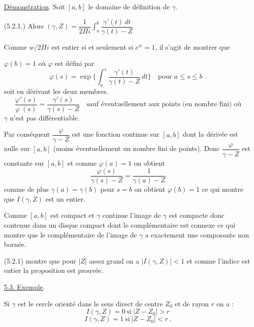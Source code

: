 
\uline{Démonstration}. Soit $[a,b]$ le domaine de définition de $\gamma$.

(5.2.1.) Alors $(\gamma,Z) = \dfrac{1}{2\Pi i}\displaystyle\int_a^b \dfrac{\gamma'(t)\,dt}{\gamma(t) - Z}$

Comme $w/2\Pi i$ est entier si et seulement si $e^{w} = 1$, il s'agit de montrer que

$\varphi(b) = 1$ où $\varphi$ est défini par
\[ \varphi(s) = \exp \{ \int_a^s \frac{\gamma'(t)}{\gamma(t)-Z}\,dt\} \quad \text{pour } a \leq s \leq b \text{ .} \]
soit en dérivant les deux membres.
\[ \frac{\varphi'(s)}{\varphi\ (s)} = \frac{\gamma'(s)}{\gamma(s)-Z} \quad \text{sauf éventuellement aux points (en nombre fini) où} \]
$\gamma$ n'est pas différentiable.

Par conséquent $\dfrac{\varphi}{\gamma-Z}$ est une fonction continue sur $[a,b]$ dont la dérivée est
nulle sur $[a,b]$ (moins éventuellement un nombre fini de points). Donc $\dfrac{\varphi}{\gamma-Z}$
est constante sur $[a,b]$ et comme $\varphi(a) = 1$ on obtient
\[ \frac{\varphi(s)}{\gamma(s) - Z} = \frac{1}{\gamma(a) - Z} \]
comme de plus $\gamma(a) = \gamma(b)$ pour $s = b$ on obtient $\varphi(b) = 1$ ce qui montre
que $I(\gamma,Z)$ est un entier.

Comme $[a,b]$ est compact et $\gamma$ continue l'image de $\gamma$ est compacte
donc contenue dans un disque compact dont le complémentaire est connexe ce
qui montre que le complémentaire de l'image de $\gamma$ a exactement une composante
non bornée.

(5.2.1) montre que pour $|Z|$ assez grand on a $|I(\gamma,Z)| < 1$ et comme
l'indice est entier la proposition est prouvée.

\uline{5.3. Exemple}.

Si $\gamma$ est le cercle orienté dans le sens direct de centre $Z_0$ et
de rayon $r$ on a :
\[ I(\gamma,Z) = 0 \ \text{si}\ |Z - Z_0| > r \]
\[ I(\gamma,Z) = 1 \ \text{si}\ |Z - Z_0| < r \ . \]

